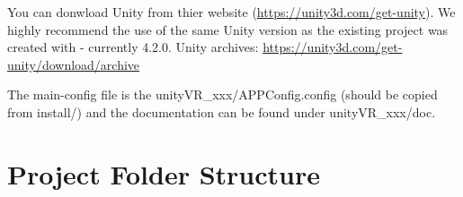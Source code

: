 \documentclass[10pt,final]{scrreprt}
\begin{document}
You can donwload Unity from thier website (\url{https://unity3d.com/get-unity}). We highly recommend the use of the same Unity version as the existing project was created with - currently 4.2.0. Unity archives: \url{https://unity3d.com/get-unity/download/archive} 

The main-config file is the unityVR\_xxx/APPConfig.config (should be copied from install/) and the documentation can be found under unityVR\_xxx/doc. 

\section{Project Folder Structure}

\end{document}

